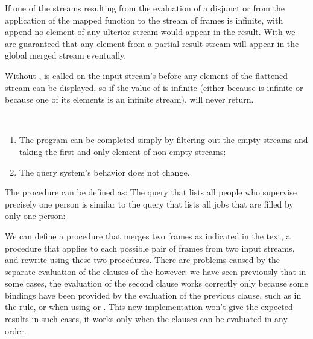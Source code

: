 \begin{exe}[4.72]
    If one of the streams resulting from the evaluation of a disjunct or from 
    the application of the mapped function to the stream of frames is infinite, 
    with append no element of any ulterior stream would appear in the result. 
    With  we are guaranteed that any element from a partial 
    result stream will appear in the global merged stream eventually.
\end{exe}

\begin{exe}[4.73]
    Without ,  is called on the input stream’s 
     before any element of the flattened stream can be displayed, so 
    if the value of  is infinite 
    (either because  is infinite or because one of its elements is 
    an infinite stream),  will never return.
\end{exe}

\begin{exe}[4.74]
    \ \vspace{-20pt}
    \begin{enumerate}
        \item The program can be completed simply by filtering out the empty 
            streams and taking the first and only element of non-empty streams:
        \item The query system’s behavior does not change.
    \end{enumerate}
\end{exe}

\begin{exe}[4.75]
    The  procedure can be defined as:
    The query that lists all people who supervise precisely one person is 
    similar to the query that lists all jobs that are filled by only one person:
\end{exe}

\begin{exe}[4.76]
    We can define a  procedure that merges two frames as 
    indicated in the text, a  procedure that applies 
     to each possible pair of frames from two input streams, 
    and rewrite  using these two procedures.
    There are problems caused by the separate evaluation of the clauses of the 
     however: we have seen previously that in some cases, the 
    evaluation of the second clause works correctly only because some bindings 
    have been provided by the evaluation of the previous clause, such as in the 
     rule, or when using  or . 
    This new implementation won’t give the expected results in such cases, it 
    works only when the clauses can be evaluated in any order.
\end{exe}

